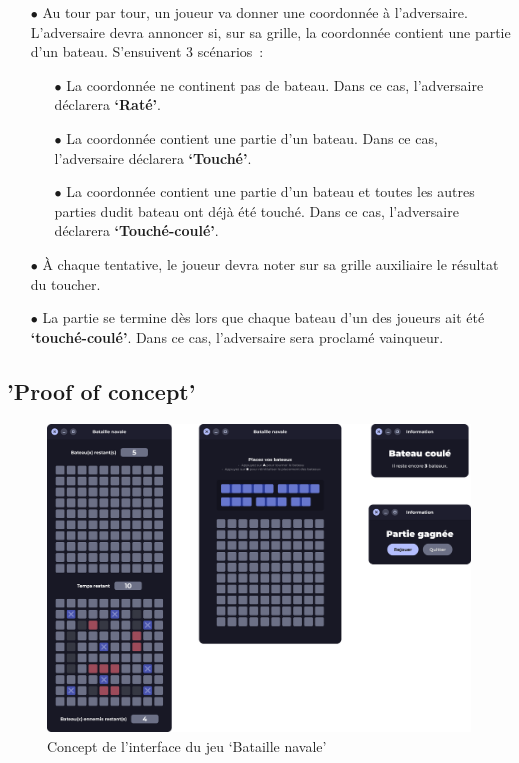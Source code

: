 \documentclass[12pt]{article}
\begin{document}
\begin{itemize}
      \item[$\bullet$] Au tour par tour, un joueur va donner une coordonnée à
            l'adversaire. L'adversaire devra annoncer si, sur sa grille, la
            coordonnée
            contient une partie d'un bateau. S'ensuivent 3 scénarios :
            \begin{itemize}
                  \item[$\bullet$] La coordonnée ne continent pas de bateau.
                        Dans ce cas, l'adversaire déclarera \textbf{`Raté'}.
                  \item[$\bullet$] La coordonnée contient une partie d'un
                        bateau. Dans ce
                        cas,
                        l'adversaire déclarera \textbf{`Touché'}.
                  \item[$\bullet$] La coordonnée contient une partie d'un
                        bateau et
                        toutes les
                        autres parties dudit bateau ont déjà été touché.
                        Dans
                        ce cas, l'adversaire
                        déclarera \textbf{`Touché-coulé'}.
            \end{itemize}

            \bigskip

      \item[$\bullet$] À chaque tentative, le joueur devra noter sur sa grille
            auxiliaire
            le
            résultat du toucher.

            \bigskip

      \item[$\bullet$] La partie se termine dès lors que chaque bateau d'un des
            joueurs
            ait
            été \textbf{`touché-coulé'}. Dans ce cas, l'adversaire sera
            proclamé vainqueur.
\end{itemize}

\subsection{'Proof of concept'}

\begin{figure}[H]
      \centering
      \includegraphics[width=0.75\linewidth]{images/POC.png}
      \caption{Concept de l'interface du jeu `Bataille navale'}
\end{figure}
\end{document}
